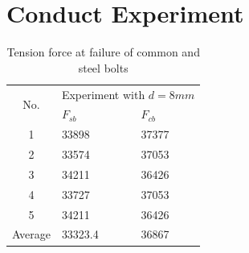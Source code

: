 \section{Conduct Experiment}
\begin{table}[ht]
	\centering
	\begin{tabular}{|c|p{2.5cm}|p{2.5cm}|}
		\hline
		\multirow{2}{*}{No.} & \multicolumn{2}{l|}{Experiment with $d=8\unit{mm}$} \\ \cline{2-3} 
		& $F_{sb}$         & $F_{cb}$                 \\ \hline
		1                    & 33898            & 37377                           \\ \hline
		2                    & 33574            & 37053                           \\ \hline
		3                    & 34211            & 36426                           \\ \hline
		4                    & 33727            & 37053                           \\ \hline
		5                    & 34211            & 36426                           \\ \hline
		Average              & 33323.4          & 36867                           \\ \hline
	\end{tabular}
	\caption{Tension force at failure of common and steel bolts}
\end{table}

